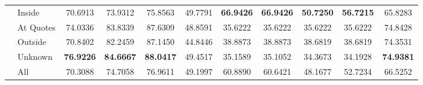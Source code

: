 \begin{table}
\begin{tabular}{llSSSSSSSSS}
 & Inside & 70.6913 & 73.9312 & 75.8563 & 49.7791 & \bfseries 66.9426 & \bfseries 66.9426 & \bfseries 50.7250 & \bfseries 56.7215 & 65.8283 \\
 & At Quotes & 74.0336 & 83.8339 & 87.6309 & 48.8591 & 35.6222 & 35.6222 & 35.6222 & 35.6222 & 74.8428 \\
 & Outside & 70.8402 & 82.2459 & 87.1450 & 44.8446 & 38.8873 & 38.8873 & 38.6819 & 38.6819 & 74.3531 \\
 & Unknown & \bfseries 76.9226 & \bfseries 84.6667 & \bfseries 88.0417 & 49.4517 & 35.1589 & 35.1052 & 34.3673 & 34.1928 & \bfseries 74.9381 \\
 & All & 70.3088 & 74.7058 & 76.9611 & 49.1997 & 60.8890 & 60.6421 & 48.1677 & 52.7234 & 66.5252 \\
\bottomrule
\end{tabular}
\end{table}

